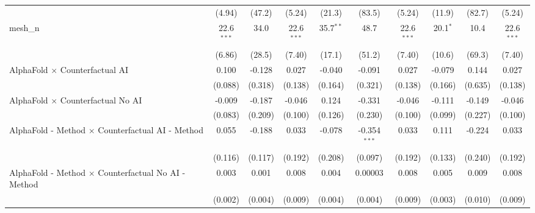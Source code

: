 \begin{tabular}{lccccccccc}
                                                               & (4.94)        & (47.2)         & (5.24)        & (21.3)         & (83.5)         & (5.24)        & (11.9)         & (82.7)         & (5.24)\\   
   mesh\_n                                                     & 22.6$^{***}$  & 34.0           & 22.6$^{***}$  & 35.7$^{**}$    & 48.7           & 22.6$^{***}$  & 20.1$^{*}$     & 10.4           & 22.6$^{***}$\\   
                                                               & (6.86)        & (28.5)         & (7.40)        & (17.1)         & (51.2)         & (7.40)        & (10.6)         & (69.3)         & (7.40)\\   
   AlphaFold $\times$ Counterfactual AI                        & 0.100         & -0.128         & 0.027         & -0.040         & -0.091         & 0.027         & -0.079         & 0.144          & 0.027\\   
                                                               & (0.088)       & (0.318)        & (0.138)       & (0.164)        & (0.321)        & (0.138)       & (0.166)        & (0.635)        & (0.138)\\   
   AlphaFold $\times$ Counterfactual No AI                     & -0.009        & -0.187         & -0.046        & 0.124          & -0.331         & -0.046        & -0.111         & -0.149         & -0.046\\   
                                                               & (0.083)       & (0.209)        & (0.100)       & (0.126)        & (0.230)        & (0.100)       & (0.099)        & (0.227)        & (0.100)\\   
   AlphaFold - Method $\times$ Counterfactual AI - Method      & 0.055         & -0.188         & 0.033         & -0.078         & -0.354$^{***}$ & 0.033         & 0.111          & -0.224         & 0.033\\   
                                                               & (0.116)       & (0.117)        & (0.192)       & (0.208)        & (0.097)        & (0.192)       & (0.133)        & (0.240)        & (0.192)\\   
   AlphaFold - Method $\times$ Counterfactual No AI - Method   & 0.003         & 0.001          & 0.008         & 0.004          & 0.00003        & 0.008         & 0.005          & 0.009          & 0.008\\   
                                                               & (0.002)       & (0.004)        & (0.009)       & (0.004)        & (0.004)        & (0.009)       & (0.003)        & (0.010)        & (0.009)\\   

\end{tabular}
